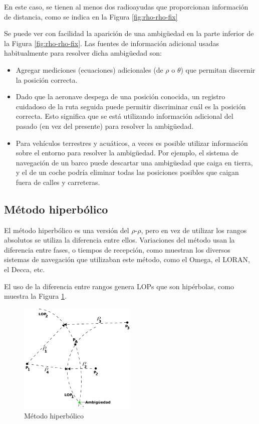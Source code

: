En este caso, se tienen al menos dos radioayudas que proporcionan informaci\'on de distancia, como se indica en la Figura \ref{fig:rho-rho-fix}

Se puede ver con facilidad la aparici\'on de una ambigüedad en la parte inferior de la Figura \ref{fig:rho-rho-fix}. Las fuentes de informaci\'on adicional usadas habitualmente para resolver dicha ambigüedad son:

\begin{itemize}\item  Agregar mediciones (ecuaciones) adicionales (de $\rho$ o $\theta$)
  que permitan discernir la posici\'on correcta.

\item Dado que la aeronave despega de una posici\'on conocida, un registro
  cuidadoso de la ruta seguida puede permitir discriminar cu\'al es la
  posici\'on correcta. Esto significa que se est\'a utilizando informaci\'on
  adicional del pasado (en vez del presente) para resolver la
  ambigüedad.

\item Para veh\'iculos terrestres y acu\'aticos, a veces es posible utilizar
  informaci\'on sobre el entorno para resolver la ambigüedad. Por
  ejemplo, el sistema de navegaci\'on de un barco puede descartar una
  ambigüedad que caiga en tierra, y el de un coche podr\'ia eliminar
  todas las posiciones posibles que caigan fuera de calles y
  carreteras.
\end{itemize}

\subsection{M\'etodo hiperb\'olico}

El m\'etodo hiperb\'olico es una versi\'on del $\rho$-$\rho$, pero en vez de utilizar los rangos absolutos se utiliza la diferencia entre ellos. Variaciones del m\'etodo usan la diferencia entre fases, o tiempos de recepci\'on, como muestran los diversos sistemas de navegaci\'on que utilizaban este m\'etodo, como el Omega, el LORAN, el Decca, etc.

El uso de la diferencia entre rangos genera LOPs que son hip\'erbolas, como muestra la Figura \ref{fig:metodo-hiperbolico}.

\begin{figure}[!h]
  \centering
  \includegraphics[width=0.5\textwidth]{./Imagenes/06.00.navegacion/hiperbolic-fix.png}
  \caption{M\'etodo hiperb\'olico}
  \label{fig:metodo-hiperbolico}
\end{figure}

